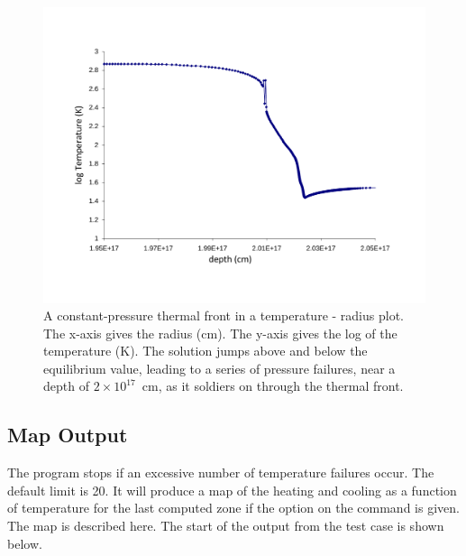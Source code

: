 \begin{figure}
\centering
\includegraphics[scale=0.5]{tempeature_depth}
\caption[Constant pressure thermal front]{\label{fig:tempeature_depth}A constant-pressure thermal front
in a temperature - radius plot.
The x-axis gives the radius (cm).  The y-axis gives the log of the
temperature (K).
The solution jumps above and below the equilibrium value,
leading to a series of pressure failures, near a depth of
$2\times 10^{17}$~cm, as
it soldiers on through the thermal front.}
\end{figure}

\subsection{Map Output}

The program stops if an excessive number of temperature failures occur.
The default limit is 20.
It will produce a map of the heating and cooling
as a function of temperature for the last computed zone if the  option
on the  command is given.
The map is described here.
The start
of the output from the test case  is shown below.

